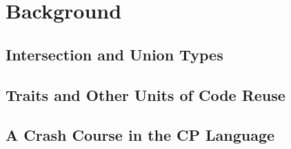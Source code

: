 \chapter{Background} \label{ch:background}

\section{Intersection and Union Types}

\section{Traits and Other Units of Code Reuse}

\section{A Crash Course in the CP Language}
